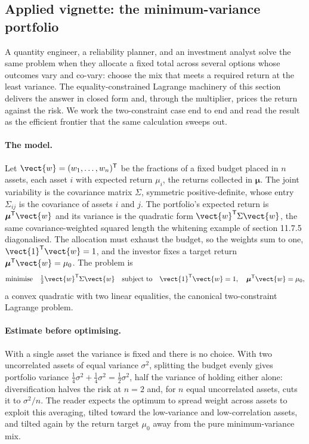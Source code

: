 \subsection{Applied vignette: the minimum-variance portfolio}

A quantity engineer, a reliability planner, and an investment analyst
solve the same problem when they allocate a fixed total across several
options whose outcomes vary and co-vary: choose the mix that meets a
required return at the least variance. The equality-constrained
Lagrange machinery of this section delivers the answer in closed form
and, through the multiplier, prices the return against the risk. We
work the two-constraint case end to end and read the result as the
efficient frontier that the same calculation sweeps out.

\paragraph{The model.} Let $\vect{w} = (w_{1}, \ldots, w_{n})^{
\mathsf{T}}$ be the fractions of a fixed budget placed in $n$ assets,
each asset $i$ with expected return $\mu_{i}$, the returns collected
in $\boldsymbol{\mu}$. The joint variability is the covariance matrix
$\Sigma$, symmetric positive-definite, whose entry $\Sigma_{ij}$ is
the covariance of assets $i$ and $j$. The portfolio's expected return
is $\boldsymbol{\mu}^{\mathsf{T}}\vect{w}$ and its variance is the
quadratic form $\vect{w}^{\mathsf{T}}\Sigma\vect{w}$, the same
covariance-weighted squared length the whitening example of section
11.7.5 diagonalised. The allocation must exhaust the budget, so the
weights sum to one, $\vect{1}^{\mathsf{T}}\vect{w} = 1$, and the
investor fixes a target return $\boldsymbol{\mu}^{\mathsf{T}}\vect{w}
= \mu_{0}$. The problem is
\[
\text{minimise}\quad \tfrac{1}{2}\vect{w}^{\mathsf{T}}\Sigma\vect{w}
\quad\text{subject to}\quad
\vect{1}^{\mathsf{T}}\vect{w} = 1, \quad
\boldsymbol{\mu}^{\mathsf{T}}\vect{w} = \mu_{0},
\]
a convex quadratic with two linear equalities, the canonical
two-constraint Lagrange problem.

\paragraph{Estimate before optimising.} With a single asset the
variance is fixed and there is no choice. With two uncorrelated assets
of equal variance $\sigma^{2}$, splitting the budget evenly gives
portfolio variance $\tfrac{1}{4}\sigma^{2} + \tfrac{1}{4}\sigma^{2} =
\tfrac{1}{2}\sigma^{2}$, half the variance of holding either alone:
diversification halves the risk at $n = 2$ and, for $n$ equal
uncorrelated assets, cuts it to $\sigma^{2}/n$. The reader expects the
optimum to spread weight across assets to exploit this averaging,
tilted toward the low-variance and low-correlation assets, and tilted
again by the return target $\mu_{0}$ away from the pure
minimum-variance mix.

